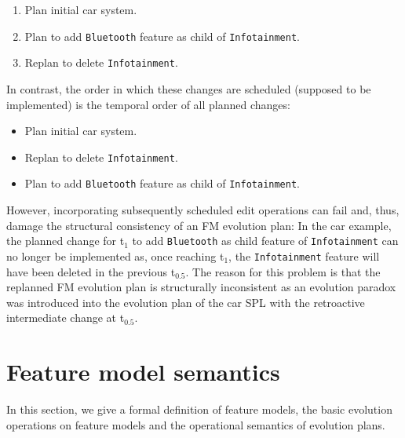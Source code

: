 \documentclass[a4paper,english]{ifimaster}
\newcommand{\timepoint}[1]{t$_#1$}
\begin{document}
\begin{enumerate}
	\item [\timepoint{0}:] Plan initial car system.
	\item [\timepoint{1}:] Plan to add \texttt{Bluetooth} feature as child of \texttt{Infotainment}.
	\item [\timepoint{0.5}:] Replan to delete \texttt{Infotainment}.
\end{enumerate}
In contrast, the order in which these changes are scheduled (supposed to be implemented) is the temporal order of all planned changes:
\begin{itemize}
	\item [\timepoint{0}:] Plan initial car system.
	\item [\timepoint{0.5}:] Replan to delete \texttt{Infotainment}.
	\item [\timepoint{1}:] Plan to add \texttt{Bluetooth} feature as child of \texttt{Infotainment}.
\end{itemize}


However, incorporating subsequently scheduled edit operations can fail and, thus, damage the structural consistency of an FM evolution plan:
In the car example, the planned change for \timepoint{1} to add \texttt{Bluetooth} as child feature of \texttt{Infotainment} can no longer be implemented as, once reaching \timepoint{1}, the \texttt{Infotainment} feature will have been deleted in the previous \timepoint{0.5}.
The reason for this problem is that the replanned FM evolution plan is structurally inconsistent as an evolution paradox was introduced into the evolution plan of the car SPL with the retroactive intermediate change at \timepoint{0.5}.

\section{Feature model semantics}%
\label{sec:feature-model-semantics}

In this section, we give a formal definition of feature models, the basic evolution operations on feature models and the operational semantics of evolution plans.
\end{document}
